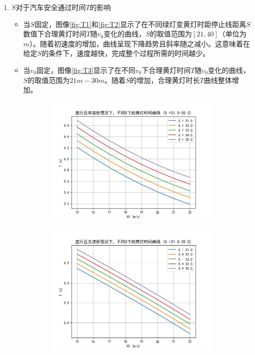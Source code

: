 \documentclass[withoutpreface,bwprint]{cumcmthesis}
\begin{document}
\begin{enumerate}
	
	\item $S$对于汽车安全通过时间$T$的影响
	\begin{itemize}
		\item 当$S$固定，图像\ref{fig:T1}和\ref{fig:T2}显示了在不同绿灯变黄灯时距停止线距离$S$数值下合理黄灯时间$T$随$v_0$变化的曲线，$S$的取值范围为$[21, 40]$（单位为$m$）。随着初速度的增加，曲线呈现下降趋势且斜率随之减小。这意味着在给定$S$的条件下，速度越快，完成整个过程所需的时间越少。
		\item 	当$v_0$固定，图像\ref{fig:T3}显示了在不同$v_0$下合理黄灯时间$T$随$v_0$变化的曲线，$S$的取值范围为$21m-30m$。随着$S$的增加，合理黄灯时长$T$曲线整体增加。
	\end{itemize}
	\begin{figure}[htbp]
		\centering
		\begin{subfigure}[t]{0.45\textwidth}
			\centering
			\includegraphics[width=\textwidth]{pics/Time_Curve_S_WCT_STR35.00}
			\label{fig:S35_WCT}
		\end{subfigure}
		\hfill %
		\begin{subfigure}[t]{0.45\textwidth}
			\centering
			\includegraphics[width=\textwidth]{pics/Time_Curve_S_WOCT_STR35.00}
			\label{fig:S35_WOCT}
		\end{subfigure}
		

\end{figure}
\end{enumerate}
\end{document}
